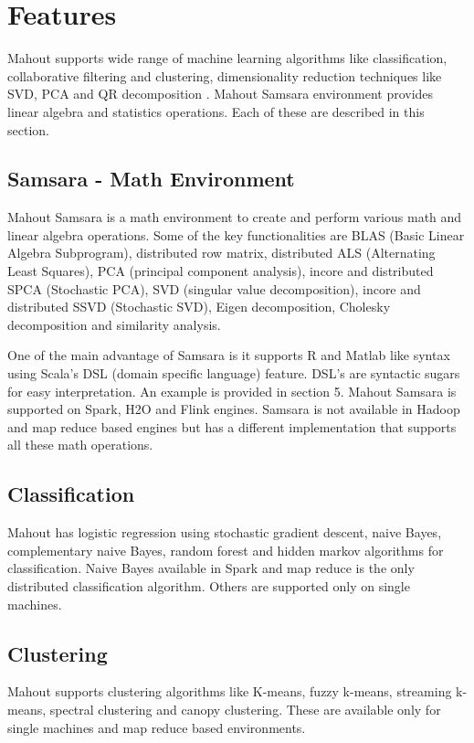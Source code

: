\documentclass[9pt,twocolumn,twoside]{../../styles/osajnl}
\begin{document}
\section{Features}
Mahout supports wide range of machine learning algorithms like
classification, collaborative filtering and clustering, dimensionality
reduction techniques like SVD, PCA and QR decomposition \CE. Mahout
Samsara environment provides linear algebra and statistics
operations. Each of these are described in this section.

\subsection{Samsara - Math Environment}
Mahout Samsara\cite{www-samsara} is a math environment to create and
perform various math and linear algebra operations. Some of the key
functionalities are BLAS (Basic Linear Algebra Subprogram),
distributed row matrix, distributed ALS (Alternating Least Squares),
PCA (principal component analysis), incore and distributed SPCA
(Stochastic PCA), SVD (singular value decomposition), incore and
distributed SSVD (Stochastic SVD), Eigen decomposition, Cholesky
decomposition and similarity analysis.

One of the main advantage of Samsara is it supports R and Matlab like
syntax using Scala's DSL (domain specific language) feature. DSL's are
syntactic sugars for easy interpretation. An example is provided in
section 5. Mahout Samsara is supported on Spark, H2O and Flink
engines. Samsara is not available in Hadoop and map reduce \TE based
engines but has a different implementation that supports all these math
operations.

\subsection{Classification}
Mahout has logistic regression using stochastic gradient descent,
naive Bayes, complementary naive Bayes, random forest and hidden
markov algorithms for classification. Naive Bayes available in Spark
and map reduce \TE is the only distributed classification algorithm. Others
are supported only on single machines.

\subsection{Clustering}
Mahout supports clustering algorithms like K-means, fuzzy k-means,
streaming k-means, spectral clustering and canopy clustering. These
are available only for single machines and map reduce based
environments.
\end{document}

